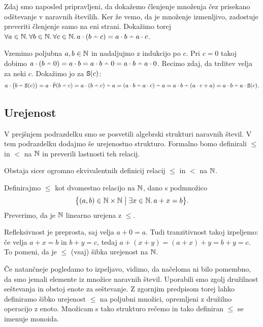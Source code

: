 Zdaj smo naposled pripravljeni, da dokažemo členjenje množenja čez prisekano odštevanje v naravnih številih. Ker že vemo, da je množenje izmenljivo, zadostuje preveriti členjenje samo na eni strani. Dokažimo torej $\all{a \in \NN}\all{b \in \NN}\all{c \in \NN}{a \cdot (b \monus c) = a \cdot b \monus a \cdot c}$.

Vzemimo poljubna $a, b \in \mathbb{N}$ in nadaljujmo z indukcijo po $c$. Pri $c = 0$ takoj dobimo $a \cdot (b \monus 0) = a \cdot b = a \cdot b \monus 0 = a \cdot b \monus a \cdot 0$. Recimo zdaj, da trditev velja za neki $c$. Dokažimo jo za $\mathtt{S}(c)$:
\[a \cdot \big(b \monus \suc(c)\big) = a \cdot \tprd(b \monus c) = a \cdot (b \monus c) \monus a = (a \cdot b \monus a \cdot c) \monus a = a \cdot b \monus (a \cdot c + a) = a \cdot b \monus a \cdot \suc(c).\]


\subsection{Urejenost}

V prejšnjem podrazdelku smo se posvetili algebrski strukturi naravnih števil. V tem podrazdelku dodajmo še urejenostno strukturo. Formalno bomo definirali $\leq$ in $<$ na $\mathbb{N}$ in preverili lastnosti teh relacij.

Obstaja sicer ogromno ekvivalentnih definicij relacij $\leq$ in $<$ na $\mathbb{N}$. 

Definirajmo $\leq$ kot dvomestno relacijo na $\mathbb{N}$, dano s podmnožico
\[\set[1]{(a, b) \in \NN \times \NN}{\some{x \in \NN}{a + x = b}}.\]
Preverimo, da je $\mathbb{N}$ linearno urejena z $\leq$.

Refleksivnost je preprosta, saj velja $a + 0 = a$. Tudi tranzitivnost takoj izpeljemo: če velja $a + x = b$ in $b + y = c$, tedaj $a + (x + y) = (a + x) + y = b + y = c$. To pomeni, da je $\leq$ (vsaj) šibka urejenost na $\mathbb{N}$.

Če natančneje pogledamo to izpeljavo, vidimo, da načeloma ni bilo pomembno, da smo jemali elemente iz množice naravnih števil. Uporabili smo zgolj družilnost seštevanja in obstoj enote za seštevanje. Z zgornjim predpisom torej lahko definiramo šibko urejenost $\leq$ na poljubni množici, opremljeni z družilno operacijo z enoto. Množicam s tako strukturo rečemo  in tako definiran $\leq$ se imenuje  monoida.

